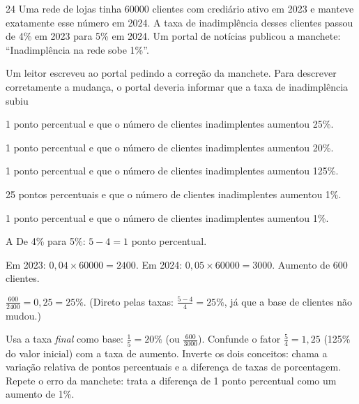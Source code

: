 \begin{questaoinedita}{2}{4}
Uma rede de lojas tinha \num{60000} clientes com crediário ativo em 2023 e
manteve exatamente esse número em 2024. A taxa de inadimplência desses clientes
passou de 4\% em 2023 para 5\% em 2024. Um portal de notícias publicou a
manchete: ``Inadimplência na rede sobe 1\%''.

Um leitor escreveu ao portal pedindo a correção da manchete. Para descrever
corretamente a mudança, o portal deveria informar que a taxa de inadimplência
subiu
\begin{alternativas}
  \item 1 ponto percentual e que o número de clientes inadimplentes aumentou 25\%.
  \item 1 ponto percentual e que o número de clientes inadimplentes aumentou 20\%.
  \item 1 ponto percentual e que o número de clientes inadimplentes aumentou 125\%.
  \item 25 pontos percentuais e que o número de clientes inadimplentes aumentou 1\%.
  \item 1 ponto percentual e que o número de clientes inadimplentes aumentou 1\%.
\end{alternativas}
\end{questaoinedita}
\begin{resolucao}{A}
 De 4\% para 5\%: $5 - 4 = 1$ ponto
percentual.

 Em 2023: $0{,}04\times\num{60000} = \num{2400}$.
Em 2024: $0{,}05\times\num{60000} = \num{3000}$. Aumento de 600 clientes.

 $\frac{600}{\num{2400}} = 0{,}25 = 25\%$. (Direto
pelas taxas: $\frac{5-4}{4} = 25\%$, já que a base de clientes não mudou.)

\begin{distratores}
 Usa a taxa \emph{final} como base: $\frac{1}{5} = 20\%$ (ou
$\frac{600}{\num{3000}}$).
 Confunde o fator $\frac{5}{4} = 1{,}25$ (125\% do valor inicial) com a
taxa de aumento.
 Inverte os dois conceitos: chama a variação relativa de pontos
percentuais e a diferença de taxas de porcentagem.
 Repete o erro da manchete: trata a diferença de 1 ponto percentual como
um aumento de 1\%.
\end{distratores}
\end{resolucao}

